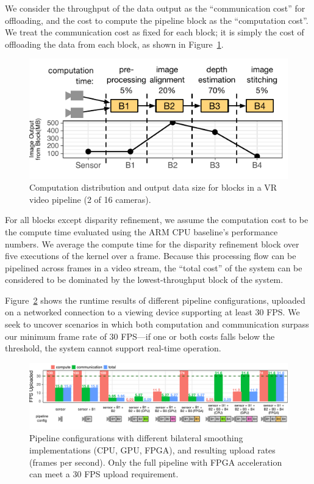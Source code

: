We consider the throughput of the data output as the ``communication cost'' for offloading, and the cost to compute the pipeline block as the ``computation cost''. We treat the communication cost as fixed for each block; it is simply the cost of offloading the data from each block, as shown in Figure~\ref{fig:vr-data-scale}.

\begin{figure}[h]
\centering
    \begin{center}
\includegraphics[width=.48\textwidth]{nsp-figs/vr_input_data.pdf}
    \end{center}
    \caption{Computation distribution and output data size for blocks in a VR video pipeline (2 of 16 cameras). }
    \label{fig:vr-data-scale}
\end{figure}

For all blocks except disparity refinement, we assume the computation cost to be the compute time evaluated using the ARM CPU baseline's performance numbers. We average the compute time for the disparity refinement block over five executions of the kernel over a frame. Because this processing flow can be pipelined across frames in a video stream, the ``total cost'' of the system can be considered to be dominated by the lowest-throughput block of the system.

Figure~\ref{fig:vr-fps} shows the runtime results of different pipeline configurations, uploaded on a networked connection to a viewing device supporting at least 30 FPS. We seek to uncover scenarios in which both computation and communication surpass our minimum frame rate of 30 FPS---if one or both costs falls below the threshold, the system cannot support real-time operation.

\begin{figure}[h]
\centering
    \begin{center}
\includegraphics[width=1.0\textwidth]{nsp-figs/vr_compute_transfer.pdf}
    \end{center}
    \caption{Pipeline configurations with different bilateral smoothing implementations (CPU, GPU, FPGA), and resulting upload rates (frames per second). Only the full pipeline with FPGA acceleration can meet a 30 FPS upload requirement.}
    \label{fig:vr-fps}
\end{figure}


